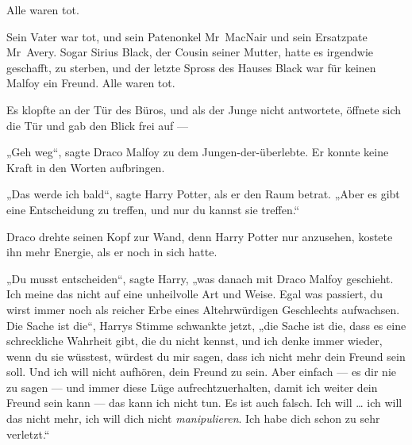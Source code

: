 Alle waren tot.

Sein Vater war tot, und sein Patenonkel Mr~MacNair und sein Ersatzpate Mr~Avery. Sogar Sirius Black, der Cousin seiner Mutter, hatte es irgendwie geschafft, zu sterben, und der letzte Spross des Hauses Black war für keinen Malfoy ein Freund. Alle waren tot.

Es klopfte an der Tür des Büros, und als der Junge nicht antwortete, öffnete sich die Tür und gab den Blick frei auf —

„Geh weg“, sagte Draco Malfoy zu dem Jungen-der-überlebte. Er konnte keine Kraft in den Worten aufbringen.

„Das werde ich bald“, sagte Harry Potter, als er den Raum betrat.
„Aber es gibt eine Entscheidung zu treffen, und nur du kannst sie treffen.“

Draco drehte seinen Kopf zur Wand, denn Harry Potter nur anzusehen, kostete ihn mehr Energie, als er noch in sich hatte.

„Du musst entscheiden“, sagte Harry, „was danach mit Draco Malfoy geschieht. Ich meine das nicht auf eine unheilvolle Art und Weise. Egal was passiert, du wirst immer noch als reicher Erbe eines Altehrwürdigen Geschlechts aufwachsen. Die Sache ist die“, Harrys Stimme schwankte jetzt, „die Sache ist die, dass es eine schreckliche Wahrheit gibt, die du nicht kennst, und ich denke immer wieder, wenn du sie wüsstest, würdest du mir sagen, dass ich nicht mehr dein Freund sein soll. Und ich will nicht aufhören, dein Freund zu sein. Aber einfach — es dir nie zu sagen — und immer diese Lüge aufrechtzuerhalten, damit ich weiter dein Freund sein kann — das kann ich nicht tun. Es ist auch falsch. Ich will … ich will das nicht mehr, ich will dich nicht \emph{manipulieren}. Ich habe dich schon zu sehr verletzt.“

